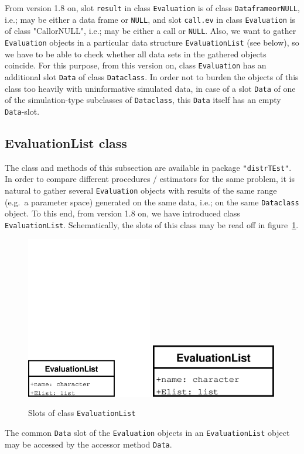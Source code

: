 \documentclass[11pt]{article}
\newcommand{\code}[1]{{\tt #1}}
\newcommand{\pkg}[1]{{\tt "#1"}}
\begin{document}
From version 1.8 on, slot \code{result} in class \code{Evaluation} is of class
\code{DataframeorNULL}, i.e.; may be either a data frame or {\tt NULL}, and slot
\code{call.ev} in class \code{Evaluation} is of class "CallorNULL", i.e.; may be
either a call or {\tt NULL}. Also, we want to gather \code{Evaluation} objects
in a particular data structure \code{EvaluationList}
(see below), so we have to be able to check whether all data sets in the
gathered objects coincide.
For this purpose, from this version on, class \code{Evaluation} has an
additional slot \code{Data} of class \code{Dataclass}. In order not to burden
the objects of this class too heavily with uninformative
simulated data, in case of a slot \code{Data} of one of the simulation-type
subclasses of \code{Dataclass},
this \code{Data}  itself has an empty \code{Data}-slot.\\

\subsection{EvaluationList class}
The class and methods of this subsection are available in package
 \pkg{distrTEst}. \\
In order to compare different procedures / estimators for the
same problem, it is natural to gather several \code{Evaluation} objects
with results of the same range (e.g.\ a parameter space) generated on the
same data, i.e.; on the same \code{Dataclass} object. To this end, from
version 1.8 on, we have introduced class \code{EvaluationList}.
Schematically, the slots of this class may be read off in figure~\ref{fig3c1}.
\begin{figure}[htb]\label{fig3-1}
  \begin{center}
    \ifpdf
    \includegraphics[viewport=0 0 436 185,width=5.5cm]{EvaluationList.pdf}%
    \else
    \includegraphics[viewport=0 0 436 185,width=5.5cm]{EvaluationList.ps}%
    \fi
    \caption{\label{fig3c1}{\footnotesize Slots of class \code{EvaluationList}}}
  \end{center}
\end{figure}
The common \code{Data} slot of the \code{Evaluation} objects in an
\code{EvaluationList} object may be accessed by the accessor method \code{Data}.
%
%
\end{document}
